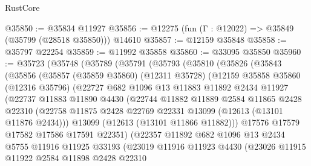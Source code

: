 \begin{lexlean}{RustCore}
\begin{coremodule}
@35850 := @35834 @11927
@35856 := @12275 (fun (Γ : @12022) => @35849 (@35799 (@28518 @35850))) @14610
@35857 := @12159 @35848
@35858 := @35797 @22254
@35859 := @11992 @35858
@35860 := @33095 @35850
@35960 := @35723
    (@35748
      (@35789
        (@35791
          (@35793
            (@35810
              (@35826
                (@35843
                  (@35856
                    (@35857
                      (@35859 @35860)
                      (@12311 @35728)
                      (@12159
                        @35858
                        @35860
                        (@12316 @35796)
                        (@22727
                          @682
                          @1096
                          @13
                          @11883
                          @11892
                          @2434
                          @11927
                          (@22737
                            @11883
                            @11890
                            @4430
                            (@22744
                              @11882
                              @11889
                              @2584
                              @11865
                              @2428
                              @22310
                              (@22758
                                @11875
                                @2428
                                @22769
                                @22331
                                @13099
                                (@12613 (@13101 @11876 @2434)))
                              @13099
                              (@12613 (@13101 @11866 @11882)))
                            @17576
                            @17579
                            @17582
                            @17586
                            @17591
                            @22351)
                          (@22357
                            @11892
                            @682
                            @1096
                            @13
                            @2434
                            @5755
                            @11916
                            @11925
                            @33193
                            (@23019
                              @11916
                              @11923
                              @4430
                              (@23026
                                @11915
                                @11922
                                @2584
                                @11898
                                @2428
                                @22310

\end{coremodule}
\end{lexlean}
